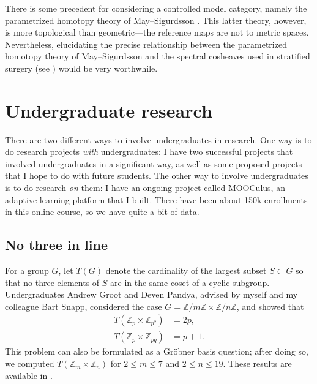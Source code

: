 \documentclass[12pt]{amsart}
\theoremstyle{definition}
\newcommand{\Z}{\mathbb{Z}}
\begin{document}
There is some precedent for considering a controlled model category,
namely the parametrized homotopy theory of May--Sigurdsson
\cite{MR2271789}.  This latter theory, however, is more topological
than geometric---the reference maps are not to metric spaces.
Nevertheless, elucidating the precise relationship between the
parametrized homotopy theory of May--Sigurdsson and the spectral
cosheaves used in stratified surgery (see \cite{MR1308714}) would be
very worthwhile.



\section{Undergraduate research}
\label{section:undergraduate-research}

There are two different ways to involve undergraduates in research.
One way is to do research projects \textit{with} undergraduates: I
have two successful projects that involved undergraduates in a
significant way, as well as some proposed projects that I hope to do
with future students.  The other way to involve undergraduates is to
do research \textit{on} them: I have an ongoing project called
MOOCulus, an adaptive learning platform that I built.  There have been
about 150k enrollments in this online course, so we have quite a bit
of data.

\subsection{No three in line}
\label{subsection:no-three-in-line}


For a group $G$, let $T(G)$ denote the cardinality of the largest
subset $S \subset G$ so that no three elements of $S$ are in the same
coset of a cyclic subgroup.  Undergraduates Andrew Groot and Deven Pandya, advised
by myself and my colleague Bart Snapp, considered the case $G =
\mathbb{Z}/m\mathbb{Z} \times \mathbb{Z}/n\mathbb{Z}$, and showed that
\begin{align*}
  T(\Z_p \times \Z_{p^2}) &= 2p, \\
  T(\Z_p \times \Z_{pq})  &= p+1.
\end{align*}
This problem can also be formulated as a Gr\"obner basis question;
after doing so, we computed $T(\Z_m \times \Z_n)$ for $2 \leq m \leq
7$ and $2 \leq n \leq 19$.  These results are available in
\cite{2012arXiv1203.6604F}.
\end{document}
